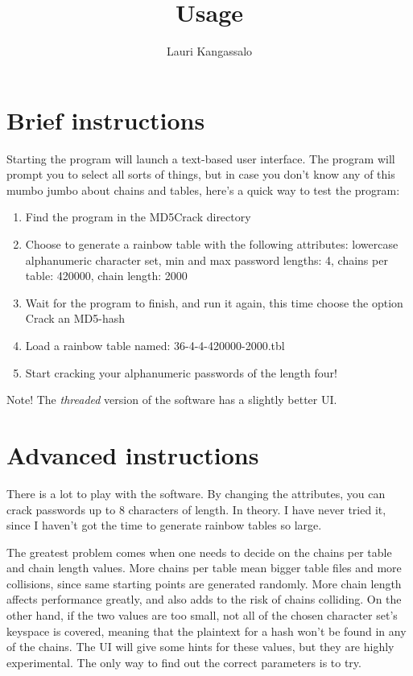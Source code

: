 \documentclass[a4paper, 11pt, finnish]{article}
\title{Usage}
\author{Lauri Kangassalo}
\begin{document}
  \maketitle

\section*{Brief instructions}
Starting the program will launch a text-based user interface. The program will prompt you to select all sorts of things, but in case you don't know any of this mumbo jumbo about chains and tables, here's a quick way to test the program:
\begin{enumerate}
\item Find the program in the MD5Crack directory
\item Choose to generate a rainbow table with the following attributes: lowercase alphanumeric character set, min and max password lengths: 4, chains per table: 420000, chain length: 2000
\item Wait for the program to finish, and run it again, this time choose the option Crack an MD5-hash
\item Load a rainbow table named: 36-4-4-420000-2000.tbl
\item Start cracking your alphanumeric passwords of the length four!
\end{enumerate}

Note! The \emph{threaded} version of the software has a slightly better UI.

\section*{Advanced instructions}
There is a lot to play with the software. By changing the attributes, you can crack passwords up to 8 characters of length. In theory. I have never tried it, since I haven't got the time to generate rainbow tables so large.

The greatest problem comes when one needs to decide on the chains per table and chain length values. More chains per table mean bigger table files and more collisions, since same starting points are generated randomly. More chain length affects performance greatly, and also adds to the risk of chains colliding. On the other hand, if the two values are too small, not all of the chosen character set's keyspace is covered, meaning that the plaintext for a hash won't be found in any of the chains. The UI will give some hints for these values, but they are highly experimental. The only way to find out the correct parameters is to try.
\end{document}
